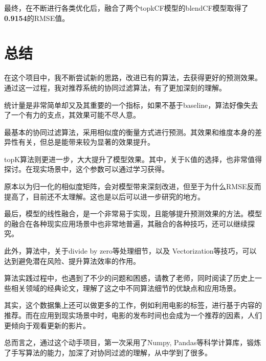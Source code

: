 \documentclass[utf8, a4paper,11pt, onecolumn]{ctexart}
\begin{document}
\begin{spacing}{1.3}
最终，在不断进行各类优化后，融合了两个topkCF模型的blendCF模型取得了\textbf{0.9154}的RMSE值。

\section{总结}

在这个项目中，我不断尝试新的思路，改进已有的算法，去获得更好的预测效果。通过这一过程，我对推荐系统的协同过滤算法，有了更加深刻的理解。

统计量是非常简单却又及其重要的一个指标，如果不基于baseline，算法好像失去了一个有力的支点，其效果可能不尽人意。

最基本的协同过滤算法，采用相似度的衡量方式进行预测。其效果和维度本身的差异性有关，但总是能带来较为显著的效果提升。

topK算法则更进一步，大大提升了模型效果。其中，关于K值的选择，也非常值得探讨。在现实场景中，这个参数可以通过学习获得。

原本以为归一化的相似度矩阵，会对模型带来深刻改进，但至于为什么RMSE反而提高了，目前还不太理解。这也是以后可以进一步研究的地方。

最后，模型的线性融合，是一个非常易于实现，且能够提升预测效果的方法。模型的融合在各种现实应用场景中也非常地普遍，其融合的各种技巧，还可以继续探究。

此外，算法中，关于divide by zero等处理细节，以及 Vectorization等技巧，可以达到避免潜在风险、提升算法效率的作用。

算法实践过程中，也遇到了不少的问题和困惑，请教了老师，同时阅读了历史上一些相关领域的经典论文\cite{breese1998empirical}\cite{sarwar2001item}，理解了这之中不同算法细节的优缺点和应用场景。

其实，这个数据集上还可以做更多的工作，例如利用电影的标签，进行基于内容的推荐。而在应用到现实场景中时，电影的发布时间也会成为一个推荐的因素，人们更倾向于观看更新的影片。

总而言之，通过这个动手项目，第一次采用了Numpy, Pandas等科学计算库，锻炼了手写算法的能力，加深了对协同过滤的理解，从中学到了很多。





\end{spacing}
\end{document}
